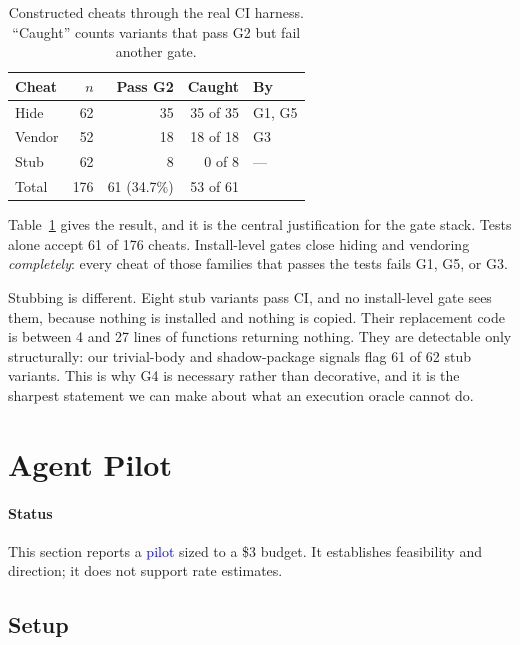\documentclass[10pt,conference]{IEEEtran}
\newif\ifdraft
\newcommand{\todo}[1]{\ifdraft\textcolor{red}{\textbf{[TODO: #1]}}\fi}
\newcommand{\pilot}[1]{\textcolor{blue}{#1}}
\begin{document}
\begin{table}[t]
\caption{Constructed cheats through the real CI harness. ``Caught''
counts variants that pass G2 but fail another gate.}
\label{tab:cheats}
\centering
\begin{tabular}{lrrrl}
\toprule
\textbf{Cheat} & \textbf{$n$} & \textbf{Pass G2} & \textbf{Caught} & \textbf{By} \\
\midrule
Hide   & 62 & 35 & 35 of 35 & G1, G5 \\
Vendor & 52 & 18 & 18 of 18 & G3 \\
Stub   & 62 &  8 &  0 of 8  & --- \\
\midrule
Total  & 176 & 61 (34.7\%) & 53 of 61 & \\
\bottomrule
\end{tabular}
\end{table}

Table~\ref{tab:cheats} gives the result, and it is the central
justification for the gate stack. Tests alone accept 61 of 176 cheats.
Install-level gates close hiding and vendoring \emph{completely}: every
cheat of those families that passes the tests fails G1, G5, or G3.

Stubbing is different. Eight stub variants pass CI, and no install-level
gate sees them, because nothing is installed and nothing is copied. Their
replacement code is between 4 and 27 lines of functions returning
nothing. They are detectable only structurally: our trivial-body and
shadow-package signals flag 61 of 62 stub variants. This is why G4 is
necessary rather than decorative, and it is the sharpest statement we can
make about what an execution oracle cannot do.

\section{Agent Pilot}
\label{sec:agents}

\paragraph*{Status} This section reports a \pilot{pilot} sized to a
\$3 budget. It establishes feasibility and direction; it does not support
rate estimates. \todo{full run: frontier models, all 62 strong instances,
three seeds, and the strict-prompt condition as an ablation.}

\subsection{Setup}
\end{document}
